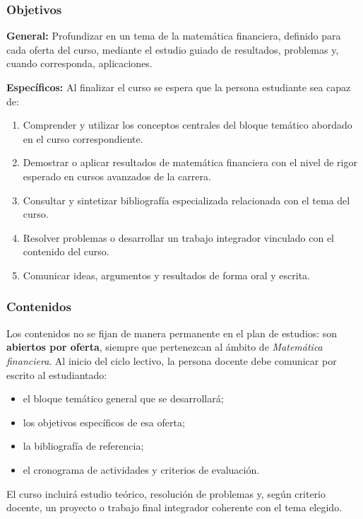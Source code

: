 \begin{refsection}
\subsubsection*{Objetivos}

\textbf{General:} Profundizar en un tema de la matemática financiera, definido para cada oferta del curso, mediante el estudio guiado de resultados, problemas y, cuando corresponda, aplicaciones.

\textbf{Específicos:} Al finalizar el curso se espera que la persona estudiante sea capaz de:

\begin{enumerate}
\item Comprender y utilizar los conceptos centrales del bloque temático abordado en el curso correspondiente.
\item Demostrar o aplicar resultados de matemática financiera con el nivel de rigor esperado en cursos avanzados de la carrera.
\item Consultar y sintetizar bibliografía especializada relacionada con el tema del curso.
\item Resolver problemas o desarrollar un trabajo integrador vinculado con el contenido del curso.
\item Comunicar ideas, argumentos y resultados de forma oral y escrita.
\end{enumerate}

\subsubsection*{Contenidos}

Los contenidos no se fijan de manera permanente en el plan de estudios: son \textbf{abiertos por oferta}, siempre que pertenezcan al ámbito de \emph{Matemática financiera}. Al inicio del ciclo lectivo, la persona docente debe comunicar por escrito al estudiantado:

\begin{itemize}
\item el bloque temático general que se desarrollará;
\item los objetivos específicos de esa oferta;
\item la bibliografía de referencia;
\item el cronograma de actividades y criterios de evaluación.
\end{itemize}

El curso incluirá estudio teórico, resolución de problemas y, según criterio docente, un proyecto o trabajo final integrador coherente con el tema elegido.


\end{refsection}
